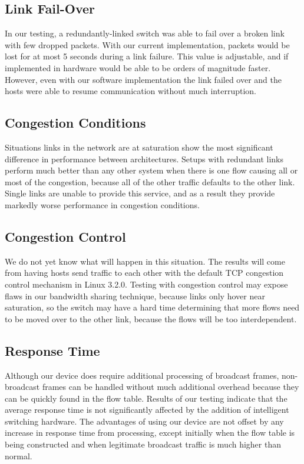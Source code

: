     \subsection{Link Fail-Over}
	In our testing, a redundantly-linked switch was able to fail over a broken link with few dropped packets.
	With our current implementation, packets would be lost for at most 5 seconds during a link failure.
	This value is adjustable, and if implemented in hardware would be able to be orders of magnitude faster.
	However, even with our software implementation the link failed over and the hosts were able to resume communication without much interruption.
	
    \subsection{Congestion Conditions}
	Situations links in the network are at saturation show the most significant difference in performance between architectures.
	Setups with redundant links perform much better than any other system when there is one flow causing all or most of the congestion, because all of  the other traffic defaults to the other link.
	Single links are unable to provide this service, and as a result they provide markedly worse performance in congestion conditions.

    \subsection{Congestion Control}
	We do not yet know what will happen in this situation.
	The results will come from having hosts send traffic to each other with the default TCP congestion control mechanism in Linux 3.2.0.
	Testing with congestion control may expose flaws in our bandwidth sharing technique, because links only hover near saturation, so the switch may have a hard time determining that more flows need to be moved over to the other link, because the flows will be too interdependent.

    \subsection{Response Time}
	Although our device does require additional processing of broadcast frames, non-broadcast frames can be handled without much additional overhead because they can be quickly found in the flow table.
	Results of our testing indicate that the average response time is not significantly affected by the addition of intelligent switching hardware.
	The advantages of using our device are not offset by any increase in response time from processing, except initially when the flow table is being constructed and when legitimate broadcast traffic is much higher than normal.
